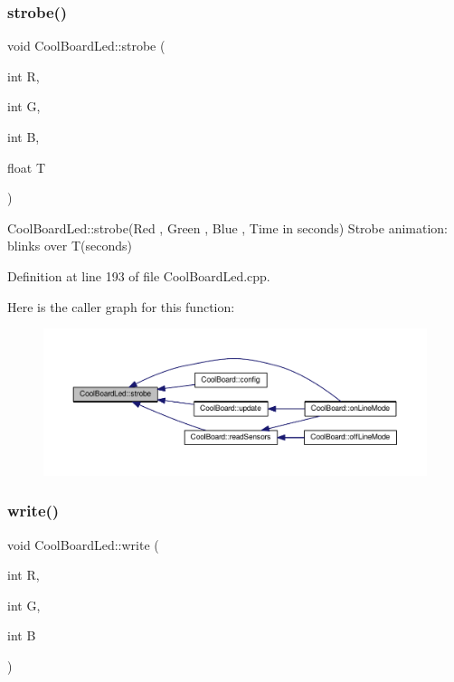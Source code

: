 \subsubsection{\texorpdfstring{strobe()}{strobe()}}
{\footnotesize\ttfamily void Cool\+Board\+Led\+::strobe (\begin{DoxyParamCaption}\item[{int}]{R,  }\item[{int}]{G,  }\item[{int}]{B,  }\item[{float}]{T }\end{DoxyParamCaption})}

Cool\+Board\+Led\+::strobe(\+Red , Green , Blue , Time in seconds) Strobe animation\+: blinks over T(seconds) 

Definition at line 193 of file Cool\+Board\+Led.\+cpp.

Here is the caller graph for this function\+:\nopagebreak
\begin{figure}[H]
\begin{center}
\leavevmode
\includegraphics[width=350pt]{class_cool_board_led_ad5f0de4c628cbfbf49896042831c64ad_icgraph}
\end{center}
\end{figure}
\mbox{\label{class_cool_board_led_a30fadd4cbec17ceea428bf7a32207e87}} 
\subsubsection{\texorpdfstring{write()}{write()}}
{\footnotesize\ttfamily void Cool\+Board\+Led\+::write (\begin{DoxyParamCaption}\item[{int}]{R,  }\item[{int}]{G,  }\item[{int}]{B }\end{DoxyParamCaption})}


